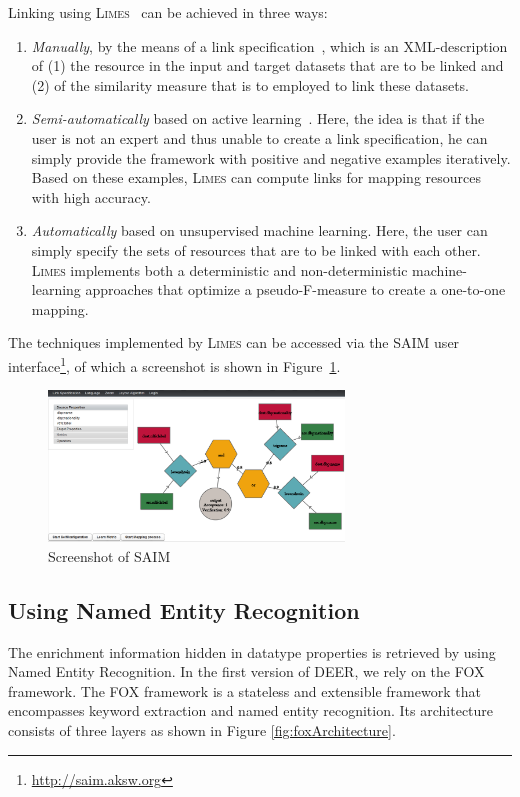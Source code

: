 \documentclass[a4paper,twoside,bibtotoc,abstracton,12pt,BCOR=15mm]{article}
\newcommand{\geolift}{\textsc{DEER}\xspace}
\newcommand{\limes}{\textsc{Limes}\xspace}
\begin{document}
Linking using \limes~\cite{NGON12c,NGON12} can be achieved in three ways:
\begin{enumerate}
\item \emph{Manually}, by the means of a link specification~\cite{NGON12c}, which is an XML-description of (1) the resource in the input and target datasets that are to be linked and (2) of the similarity measure that is to employed to link these datasets.
\item \emph{Semi-automatically} based on active learning~\cite{NGO+11a,NGLY12,NGO+13b}. Here, the idea is that if the user is not an expert and thus unable to create a link specification, he can simply provide the framework with positive and negative examples iteratively. 
Based on these examples, \limes can compute links for mapping resources with high accuracy.
\item \emph{Automatically} based on unsupervised machine learning. Here, the user can simply specify the sets of resources that are to be linked with each other. 
\limes implements both a deterministic and non-deterministic machine-learning approaches that optimize a pseudo-F-measure to create a one-to-one mapping.
\end{enumerate}

The techniques implemented by \limes can be accessed via the SAIM user interface\footnote{\url{http://saim.aksw.org}}, of which a screenshot is shown in Figure~\ref{fig:saim_screenshot}.
\begin{figure}[htb]
\centering
\includegraphics[width=0.7\textwidth]{images/saim_screenshot}
\caption{Screenshot of SAIM}
\label{fig:saim_screenshot}
\end{figure}

\subsection{Using Named Entity Recognition}
The enrichment information hidden in datatype properties is retrieved by using Named Entity Recognition.
In the first version of \geolift, we rely on the FOX framework.
The FOX framework is a stateless and extensible framework that encompasses keyword extraction and named entity recognition. 
Its architecture consists of three layers as shown in Figure \ref{fig:foxArchitecture}.
\end{document}
